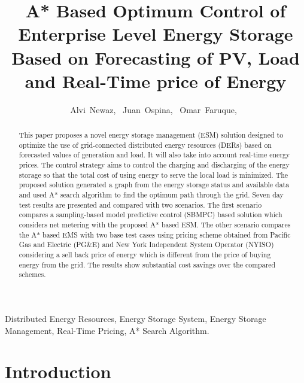 \documentclass[journal]{IEEEtran}
\begin{document}
\title{A* Based Optimum Control of Enterprise Level Energy Storage Based on Forecasting of PV, Load and Real-Time price of Energy}

\author{ Alvi~Newaz,~
Juan~Ospina,~
     Omar~Faruque,~
        }%





\maketitle                                                               

\begin{abstract}
This paper proposes a novel energy storage management (ESM) solution designed to optimize the use of grid-connected distributed energy resources (DERs) based on forecasted values of generation and load. It will also take into account real-time energy prices. The control strategy aims to control the charging and discharging of the energy storage so that the total cost of using energy to serve the local load is minimized.
The proposed solution generated a graph from the energy storage status and available data and used A* search algorithm to find the optimum path through the grid. Seven day test results are presented and compared with two scenarios. The first scenario compares a sampling-based model predictive control (SBMPC) based solution which considers net metering with the proposed A* based ESM. The other scenario compares the A* based EMS with two base test cases using pricing scheme obtained from Pacific Gas and Electric (PG\&E) and New York Independent System Operator (NYISO) considering a sell back price of energy which is different from the price of buying energy from the grid. The results show substantial cost savings over the compared schemes.


\end{abstract}


\begin{IEEEkeywords}
Distributed Energy Resources, Energy Storage System, Energy Storage Management, Real-Time Pricing, A* Search Algorithm.
\end{IEEEkeywords}


\IEEEpeerreviewmaketitle



\section{Introduction}

\end{document}
